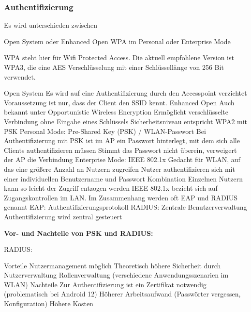 \documentclass[10pt]{article}
\begin{document}
\begin{flushleft}
\subsubsection{Authentifizierung}

Es wird unterschieden zwischen
\begin{outline}
    \1 Open System oder Enhanced Open
    \1 WPA im Personal oder Enterprise Mode
\end{outline}

WPA steht hier für Wifi Protected Access. Die aktuell empfohlene Version ist WPA3, die eine AES Verschlüsselung mit einer Schlüssellänge von 256 Bit verwendet.

\begin{outline}
    \1 Open System
        \2 Es wird auf eine Authentifizierung durch den Accesspoint verzichtet
        \2 Voraussetzung ist nur, dass der Client den SSID kennt.
    \1 Enhanced Open
        \2 Auch bekannt unter Opportunistic Wireless Encryption
        \2 Ermöglicht verschlüsselte Verbindung ohne Eingabe eines Schlüssels
        \2 Sicherheitsniveau entspricht WPA2 mit PSK
    \1 Personal Mode: Pre-Shared Key (PSK) / WLAN-Passwort
        \2 Bei Authentifizierung mit PSK ist im AP ein Passwort hinterlegt, mit dem sich alle Clients authentifizieren müssen
        \2 Stimmt das Passwort nicht überein, verweigert der AP die Verbindung
    \1 Enterprise Mode: IEEE 802.1x
        \2 Gedacht für WLAN, auf das eine größere Anzahl an Nutzern zugreifen
        \2 Nutzer authentifizieren sich mit einer individuellen Benutzername und Passwort Kombination
        \2 Einzelnen Nutzern kann so leicht der Zugriff entzogen werden
        \2 IEEE 802.1x bezieht sich auf Zugangskontrollen im LAN. Im Zusammenhang werden oft EAP und RADIUS genannt
        \2 EAP: Authentifizierungsprotokoll
        \2 RADIUS:
            \3 Zentrale Benutzerverwaltung
            \3 Authentifizierung wird zentral gesteuert 
\end{outline}


\textbf{Vor- und Nachteile von PSK und RADIUS:}

RADIUS:
\begin{outline}
    \1 Vorteile
        \2 Nutzermanagement möglich
        \2 Theoretisch höhere Sicherheit durch Nutzerverwaltung
        \2 Rollenverwaltung (verschiedene Anwendungsszenarien im WLAN)
    \1 Nachteile
        \2 Zur Authentifizierung ist ein Zertifikat notwendig (problematisch bei Android 12)
        \2 Höherer Arbeitsaufwand (Passwörter vergessen, Konfiguration)
        \2 Höhere Kosten 
\end{outline}


\end{flushleft}
\end{document}
